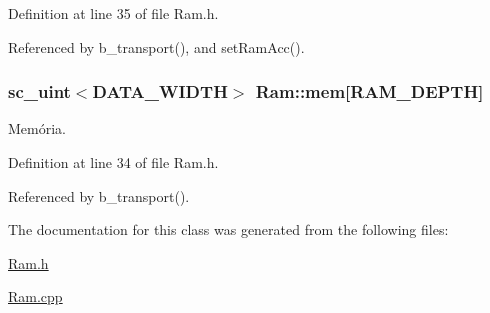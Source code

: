 Definition at line 35 of file Ram.\+h.



Referenced by b\+\_\+transport(), and set\+Ram\+Acc().

\hypertarget{classRam_ade86bafdb14f3ddb236bcf807abab45c}{
\subsubsection[{mem}]{\setlength{\rightskip}{0pt plus 5cm}sc\+\_\+uint$<${\bf D\+A\+T\+A\+\_\+\+W\+I\+D\+T\+H}$>$ Ram\+::mem\mbox{[}{\bf R\+A\+M\+\_\+\+D\+E\+P\+T\+H}\mbox{]}\hspace{0.3cm}{\ttfamily [private]}}}\label{classRam_ade86bafdb14f3ddb236bcf807abab45c}
Memória. 

Definition at line 34 of file Ram.\+h.



Referenced by b\+\_\+transport().



The documentation for this class was generated from the following files\+:\begin{DoxyCompactItemize}
\item 
\hyperlink{Ram_8h}{Ram.\+h}\item 
\hyperlink{Ram_8cpp}{Ram.\+cpp}\end{DoxyCompactItemize}
